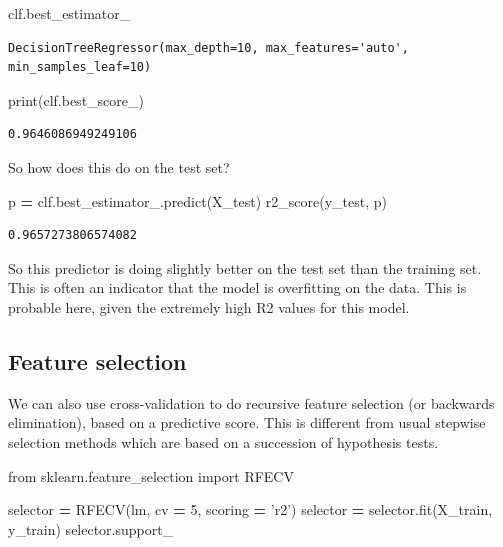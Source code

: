 \documentclass[
  letterpaper,
]{scrbook}
\newenvironment{Shaded}{\begin{snugshade}}{\end{snugshade}}
\newcommand{\BuiltInTok}[1]{#1}
\newcommand{\DecValTok}[1]{\textcolor[rgb]{0.00,0.00,0.81}{#1}}
\newcommand{\ImportTok}[1]{#1}
\newcommand{\NormalTok}[1]{#1}
\newcommand{\OperatorTok}[1]{\textcolor[rgb]{0.81,0.36,0.00}{\textbf{#1}}}
\newcommand{\StringTok}[1]{\textcolor[rgb]{0.31,0.60,0.02}{#1}}
\begin{document}
\begin{Shaded}
\begin{Highlighting}[]
\NormalTok{clf.best_estimator_}
\end{Highlighting}
\end{Shaded}

\begin{verbatim}
DecisionTreeRegressor(max_depth=10, max_features='auto', min_samples_leaf=10)
\end{verbatim}

\begin{Shaded}
\begin{Highlighting}[]
\BuiltInTok{print}\NormalTok{(clf.best_score_)}
\end{Highlighting}
\end{Shaded}

\begin{verbatim}
0.9646086949249106
\end{verbatim}

So how does this do on the test set?

\begin{Shaded}
\begin{Highlighting}[]
\NormalTok{p }\OperatorTok{=}\NormalTok{ clf.best_estimator_.predict(X_test)}
\NormalTok{r2_score(y_test, p)}
\end{Highlighting}
\end{Shaded}

\begin{verbatim}
0.9657273806574082
\end{verbatim}

So this predictor is doing slightly better on the test set than the training set. This is often an indicator that the model is overfitting on the data. This is probable here, given the extremely high R2 values for this model.

\hypertarget{feature-selection}{%
\subsection{Feature selection}\label{feature-selection}}

We can also use cross-validation to do recursive feature selection (or
backwards elimination), based on a predictive score. This is different
from usual stepwise selection methods which are based on a succession of
hypothesis tests.

\begin{Shaded}
\begin{Highlighting}[]
\ImportTok{from}\NormalTok{ sklearn.feature_selection }\ImportTok{import}\NormalTok{ RFECV}

\NormalTok{selector }\OperatorTok{=}\NormalTok{ RFECV(lm, cv }\OperatorTok{=} \DecValTok{5}\NormalTok{, scoring }\OperatorTok{=} \StringTok{'r2'}\NormalTok{)}
\NormalTok{selector }\OperatorTok{=}\NormalTok{ selector.fit(X_train, y_train)}
\NormalTok{selector.support_}
\end{Highlighting}
\end{Shaded}
\end{document}
